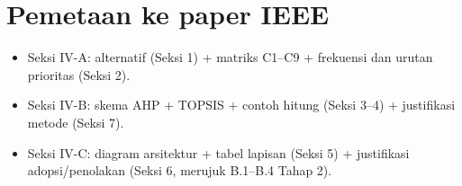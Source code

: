 \documentclass[a4paper,11pt]{article}
\begin{document}
\section{Pemetaan ke paper IEEE}

\begin{itemize}
\item Seksi IV-A: alternatif (Seksi 1) + matriks C1--C9 + frekuensi dan urutan prioritas (Seksi 2).
\item Seksi IV-B: skema AHP + TOPSIS + contoh hitung (Seksi 3--4) + justifikasi metode (Seksi 7).
\item Seksi IV-C: diagram arsitektur + tabel lapisan (Seksi 5) + justifikasi adopsi/penolakan (Seksi 6, merujuk B.1--B.4 Tahap 2).
\end{itemize}
\end{document}
